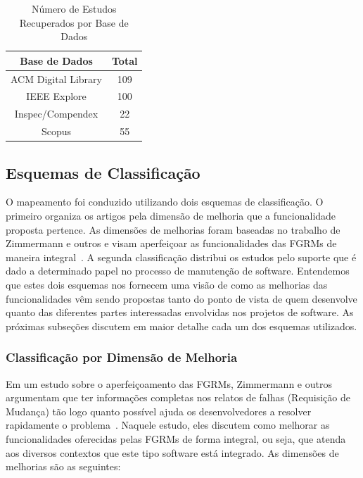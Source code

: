 \begin{table}[htb] \centering \caption{Número de Estudos Recuperados por Base de
		Dados}\label{tab:estudos-por-base-dados} \begin{tabular}{cc} \hline
		\textbf{Base de Dados} & \textbf{Total} \\ \hline ACM Digital Library
		& 109            \\ IEEE Explore           & 100            \\
		Inspec/Compendex       & 22             \\ Scopus                 & 55
		\\ \hline \end{tabular}

\end{table}

\subsection{Esquemas de Classificação}
\label{subsec:map-esquemas-classificacao}

O mapeamento foi conduzido utilizando dois esquemas de classificação. O primeiro
organiza os artigos pela dimensão de melhoria que a funcionalidade proposta
pertence. As dimensões de melhorias foram baseadas no trabalho de Zimmermann e
outros e visam aperfeiçoar as funcionalidades das FGRMs de maneira
integral~\cite{zimmermann2009improving}. A segunda classificação distribui os
estudos pelo suporte que é dado a determinado papel no processo de manutenção de
software. Entendemos que estes dois esquemas nos fornecem uma visão de como as
melhorias das funcionalidades vêm sendo propostas tanto do ponto de vista de
quem desenvolve quanto das diferentes partes interessadas envolvidas nos
projetos de software. As pró\-xi\-mas subseções discutem em maior detalhe cada
um dos esquemas utilizados.

\subsubsection{Classificação por Dimensão de Melhoria}
\label{subsubsec:map-esquema-suporte-problema}

Em um estudo sobre o aperfeiçoamento das FGRMs, Zimmermann e outros argumentam
que ter informações completas nos relatos de falhas (Requisição de Mudança) tão
logo quanto possível ajuda os desenvolvedores a resolver rapidamente o
problema~\cite{zimmermann2009improving}. Naquele estudo, eles discutem como
melhorar as funcionalidades oferecidas pelas FGRMs de forma integral, ou seja,
que atenda aos diversos contextos que este tipo software está integrado. As
dimensões de melhorias são as seguintes:

